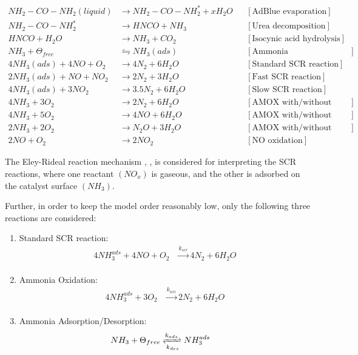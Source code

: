 \begin{align*}
    NH_2 - CO - NH_2 (liquid) &\longrightarrow NH_2 - CO - NH_2^* + x H_2 O
                & &[\text{AdBlue evaporation}] \\
    NH_2 - CO - NH_2^*  &\longrightarrow  HNCO + NH_3
                & &[\text{Urea decomposition}] \\
    HNCO + H_2O &\longrightarrow NH_3 + CO_2
                & &[\text{Isocynic acid hydrolysis}] \\
    NH_3 + \Theta_{free} &\leftrightharpoons NH_3(ads)
                         & &[\text{Ammonia Adsorption/Desorption}]\\
    4 NH_3 (ads) + 4 NO + O_2 &\longrightarrow 4 N_2 + 6 H_2O
                              & &[\text{Standard SCR reaction}]\\
    2 NH_3 (ads) +  NO + N O_2 &\longrightarrow 2 N_2 + 3 H_2O
                              & &[\text{Fast SCR reaction}]\\
    4 NH_3 (ads) + 3N O_2 &\longrightarrow 3.5 N_2 + 6 H_2O
                              & &[\text{Slow SCR reaction}]\\
    4 NH_3 + 3 O_2 &\longrightarrow 2 N_2 + 6 H_2O
                         & &[\text{AMOX with/without ASC}]\\
    4 NH_3 + 5 O_2 &\longrightarrow 4 NO + 6 H_2 O
                         & &[\text{AMOX with/without ASC}]\\
    2 NH_3 + 2 O_2 &\longrightarrow N_2O + 3 H_2O
                         & &[\text{AMOX with/without ASC}]\\
    2 NO + O_2 &\longrightarrow 2 NO_2
                        & &[\text{NO oxidation}]
\end{align*}

The Eley-Rideal reaction mechanism \cite{yuan2015diesel}, \cite{hsieh2011development}, \cite{nova2014urea} is considered
for interpreting the SCR reactions, where one reactant $(NO_x)$ is gaseous, and the other is adsorbed on the catalyst
surface $(NH_3)$.

Further, in order to keep the model order reasonably low, only the following three reactions are considered:
\begin{enumerate}
    \item Standard SCR reaction:
    \begin{align}
        4 NH_3 ^{ads} + 4 NO + O_2 &\xrightarrow[]{k_{scr}} 4 N_2 + 6 H_2O \label{eqn::std_scr}
    \end{align}
    \item Ammonia Oxidation:
    \begin{align}
        4 NH_3^{ads} + 3 O_2 &\xrightarrow[]{k_{oxi}} 2 N_2 + 6 H_2O \label{eqn::amox}
    \end{align}
    \item Ammonia Adsorption/Desorption:
        \begin{align}
            NH_3 + \Theta_{free} &\xrightleftharpoons[k_{des}]{k_{ads}} NH_3^{ads}
            \label{eqn::ads}
        \end{align}
\end{enumerate}


